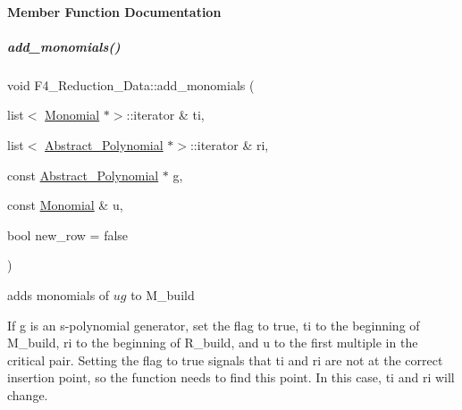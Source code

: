 \paragraph{Member Function Documentation}
\mbox{\label{group___g_b_computation_ad241aa62afb6b6e0b482496c7559f092}} 
\subparagraph{\texorpdfstring{add\+\_\+monomials()}{add\_monomials()}\hspace{0.1cm}{\footnotesize\ttfamily [1/3]}}
{\footnotesize\ttfamily void F4\+\_\+\+Reduction\+\_\+\+Data\+::add\+\_\+monomials (\begin{DoxyParamCaption}\item[{list$<$ \hyperlink{group__polygroup_class_monomial}{Monomial} $\ast$$>$\+::iterator \&}]{ti,  }\item[{list$<$ \hyperlink{group__polygroup_class_abstract___polynomial}{Abstract\+\_\+\+Polynomial} $\ast$$>$\+::iterator \&}]{ri,  }\item[{const \hyperlink{group__polygroup_class_abstract___polynomial}{Abstract\+\_\+\+Polynomial} $\ast$}]{g,  }\item[{const \hyperlink{group__polygroup_class_monomial}{Monomial} \&}]{u,  }\item[{bool}]{new\+\_\+row = {\ttfamily false} }\end{DoxyParamCaption})}



adds monomials of $ ug $ to {\ttfamily M\+\_\+build} 

If {\ttfamily g} is an s-\/polynomial generator, set the flag to {\ttfamily true}, {\ttfamily ti} to the beginning of {\ttfamily M\+\_\+build}, {\ttfamily ri} to the beginning of {\ttfamily R\+\_\+build}, and {\ttfamily u} to the first multiple in the critical pair. Setting the flag to {\ttfamily true} signals that {\ttfamily ti} and {\ttfamily ri} are not at the correct insertion point, so the function needs to find this point. In this case, {\ttfamily ti} and {\ttfamily ri} will change.

